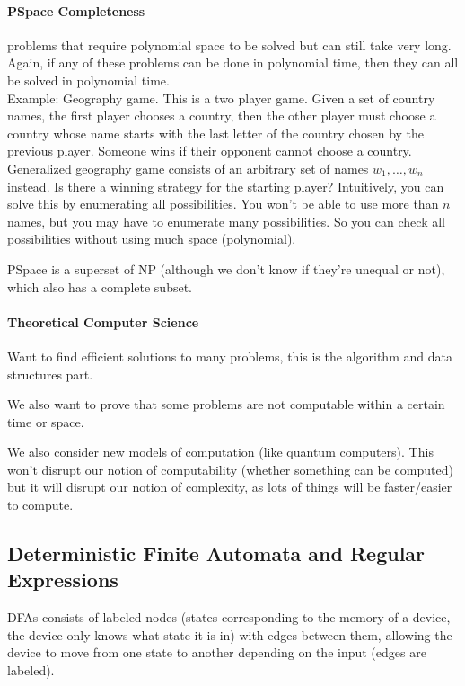 \documentclass[12 pt]{article}
\begin{document}
\paragraph{PSpace Completeness} problems that require polynomial space to be solved but can
still take very long. Again, if any of these problems can be done in
polynomial time, then they can all be solved in polynomial time.
\\ Example: Geography game. This is a two player game. Given a set of
country names, the first player chooses a country, then the other
player must choose a country whose name starts with the last letter of
the country chosen by the previous player. Someone wins if their
opponent cannot choose a country.
\\ Generalized geography game consists of an arbitrary set of names
$w_1, \ldots, w_n$ instead. Is there a winning strategy for the
starting player? Intuitively, you can solve this by enumerating all
possibilities. You won't be able to use more than $n$ names, but you
may have to enumerate many possibilities. So you can check all
possibilities without using much space (polynomial).

PSpace is a superset of NP (although we don't know if they're unequal
or not), which also has a complete subset.

\paragraph{Theoretical Computer Science}
Want to find efficient solutions to many problems, this is the
algorithm and data structures part.

We also want to prove that some problems are not computable within a
certain time or space.

We also consider new models of computation (like quantum
computers). This won't disrupt our notion of computability (whether
something can be computed) but it will disrupt our notion of
complexity, as lots of things will be faster/easier to compute.

\subsection{Deterministic Finite Automata and Regular Expressions}
DFAs consists of labeled nodes (states corresponding to the memory of
a device, the device only knows what state it is in) with edges
between them, allowing the device to move from one state to another
depending on the input (edges are labeled).
\end{document}
